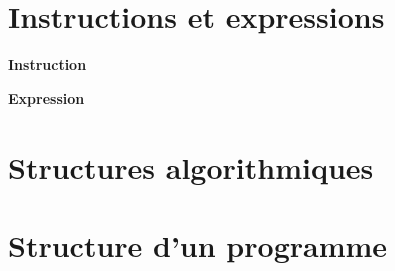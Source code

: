 \documentclass[10pt]{article}
\begin{document}
\section{Instructions et expressions}

\begin{defi}
\textbf{Instruction}

\textbf{Expression}
\end{defi}

\begin{exemple}

\end{exemple}

\section{Structures algorithmiques}


\section{Structure d'un programme}

 \renewcommand{\baselinestretch}{1.2}
\setlength{\parskip}{2ex plus 0.5ex minus 0.2ex}
\end{document}
